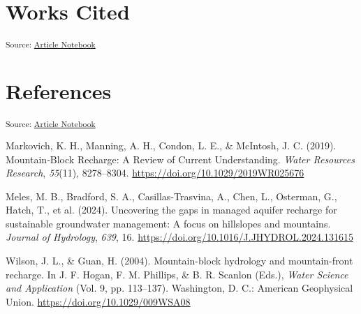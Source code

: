 \documentclass[
]{agujournal2019}
\newlength{\cslhangindent}
\newenvironment{CSLReferences}[2] %
 {\begin{list}{}{%
  \setlength{\itemindent}{0pt}
  \setlength{\leftmargin}{0pt}
  \setlength{\parsep}{0pt}
  \ifodd #1
   \setlength{\leftmargin}{\cslhangindent}
   \setlength{\itemindent}{-1\cslhangindent}
  \fi
  \setlength{\itemsep}{#2\baselineskip}}}
 {\end{list}}
\begin{document}
\section{Works Cited}\label{works-cited}

\textsubscript{Source:
\href{https://Ryan3Lima.github.io/ATUR-Hillslope-Road/index.ipynb.html}{Article
Notebook}}

\section*{References}\label{references}

\vspace{1em}

\textsubscript{Source:
\href{https://Ryan3Lima.github.io/ATUR-Hillslope-Road/index.ipynb.html}{Article
Notebook}}

\label{refs}
\begin{CSLReferences}{1}{0}
Markovich, K. H., Manning, A. H., Condon, L. E., \& McIntosh, J. C.
(2019). Mountain‐{Block} {Recharge}: {A} {Review} of {Current}
{Understanding}. \emph{Water Resources Research}, \emph{55}(11),
8278--8304. \url{https://doi.org/10.1029/2019WR025676}

Meles, M. B., Bradford, S. A., Casillas-Trasvina, A., Chen, L.,
Osterman, G., Hatch, T., et al. (2024). Uncovering the gaps in managed
aquifer recharge for sustainable groundwater management: {A} focus on
hillslopes and mountains. \emph{Journal of Hydrology}, \emph{639}, 16.
\url{https://doi.org/10.1016/J.JHYDROL.2024.131615}

Wilson, J. L., \& Guan, H. (2004). Mountain-block hydrology and
mountain-front recharge. In J. F. Hogan, F. M. Phillips, \& B. R.
Scanlon (Eds.), \emph{Water {Science} and {Application}} (Vol. 9, pp.
113--137). Washington, D. C.: American Geophysical Union.
\url{https://doi.org/10.1029/009WSA08}

\end{CSLReferences}
\end{document}
